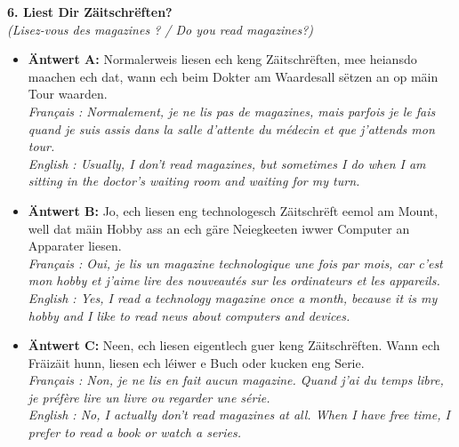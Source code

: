 \noindent\textbf{6. Liest Dir Zäitschrëften?}\\
\textit{(Lisez-vous des magazines ? / Do you read magazines?)}
\begin{itemize}
    \item \textbf{Äntwert A:} Normalerweis liesen ech keng Zäitschrëften, mee heiansdo maachen ech dat, wann ech beim Dokter am Waardesall sëtzen an op mäin Tour waarden.\\
    \textit{Français : Normalement, je ne lis pas de magazines, mais parfois je le fais quand je suis assis dans la salle d'attente du médecin et que j'attends mon tour.}\\
    \textit{English : Usually, I don't read magazines, but sometimes I do when I am sitting in the doctor's waiting room and waiting for my turn.}
    \item \textbf{Äntwert B:} Jo, ech liesen eng technologesch Zäitschrëft eemol am Mount, well dat mäin Hobby ass an ech gäre Neiegkeeten iwwer Computer an Apparater liesen.\\
    \textit{Français : Oui, je lis un magazine technologique une fois par mois, car c'est mon hobby et j'aime lire des nouveautés sur les ordinateurs et les appareils.}\\
    \textit{English : Yes, I read a technology magazine once a month, because it is my hobby and I like to read news about computers and devices.}
    \item \textbf{Äntwert C:} Neen, ech liesen eigentlech guer keng Zäitschrëften. Wann ech Fräizäit hunn, liesen ech léiwer e Buch oder kucken eng Serie.\\
    \textit{Français : Non, je ne lis en fait aucun magazine. Quand j'ai du temps libre, je préfère lire un livre ou regarder une série.}\\
    \textit{English : No, I actually don't read magazines at all. When I have free time, I prefer to read a book or watch a series.}
\end{itemize}
\vspace{0.5em}

